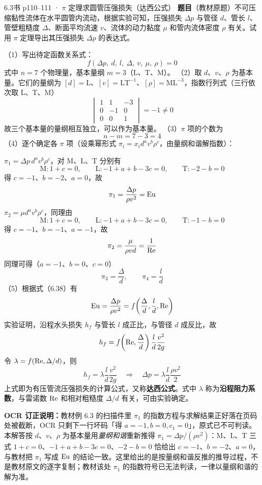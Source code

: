 \begin{liti}{6.3}{书 p110--111 · $\pi$ 定理求圆管压强损失（达西公式）}
\textbf{题目}（教材原题）不可压缩黏性流体在水平圆管内流动，根据实验可知，压强损失 $\Delta p$ 与管径 $d$、管长 $l$、管壁粗糙度 $\Delta$、断面平均流速 $v$、流体的动力黏度 $\mu$ 和管内流体密度 $\rho$ 有关。试用 $\pi$ 定理导出其压强损失 $\Delta p$ 的表达式。


\begin{jie}
（1）写出待定函数关系式：
\[ f(\Delta p,\ d,\ l,\ \Delta,\ v,\ \mu,\ \rho)=0 \]
式中 $n=7$ 个物理量，基本量纲 $m=3$（$\mathrm{L}$、$\mathrm{T}$、$\mathrm{M}$）。
（2）取 $d$、$v$、$\rho$ 为基本量。它们的量纲为 $[d]=\mathrm{L}$、$[v]=\mathrm{LT^{-1}}$、$[\rho]=\mathrm{ML^{-3}}$，指数行列式（三行依次取 $\mathrm{L}$、$\mathrm{T}$、$\mathrm{M}$）
\[ \begin{vmatrix}1 & 1 & -3\\ 0 & -1 & 0\\ 0 & 0 & 1\end{vmatrix}=-1\neq 0 \]
故三个基本量的量纲相互独立，可以作为基本量。
（3）$\pi$ 项的个数为
\[ n-m=7-3=4 \]
（4）逐个确定各 $\pi$ 项（设乘幂形式 $\pi_i=x_i d^{a}v^{b}\rho^{c}$，由量纲和谐解指数）：

$\pi_1=\Delta p\,d^{a}v^{b}\rho^{c}$，对 $\mathrm{M}$、$\mathrm{L}$、$\mathrm{T}$ 分别有
\[ \mathrm{M}:1+c=0,\qquad \mathrm{L}:-1+a+b-3c=0,\qquad \mathrm{T}:-2-b=0 \]
得 $c=-1$、$b=-2$、$a=0$，故
\[ \pi_1=\frac{\Delta p}{\rho v^{2}}=\mathrm{Eu} \]
$\pi_2=\mu d^{a}v^{b}\rho^{c}$，同理由
\[ \mathrm{M}:1+c=0,\qquad \mathrm{L}:-1+a+b-3c=0,\qquad \mathrm{T}:-1-b=0 \]
得 $c=-1$、$b=-1$、$a=-1$，故
\[ \pi_2=\frac{\mu}{\rho v d}=\frac{1}{\mathrm{Re}} \]
同理可得（$a=-1$、$b=0$、$c=0$）
\[ \pi_3=\frac{\Delta}{d},\qquad \pi_4=\frac{l}{d} \]
（5）根据式（6.38）有
\[ \mathrm{Eu}=\frac{\Delta p}{\rho v^{2}}=f\!\left(\frac{\Delta}{d},\frac{l}{d},\mathrm{Re}\right) \]
实验证明，沿程水头损失 $h_f$ 与管长 $l$ 成正比，与管径 $d$ 成反比，故
\[ h_f=f\!\left(\mathrm{Re},\frac{\Delta}{d}\right)\frac{l}{d}\frac{v^{2}}{2g} \]
令 $\lambda=f(\mathrm{Re},\Delta/d)$，则
\[ h_f=\lambda\frac{l}{d}\frac{v^{2}}{2g}\quad\Longrightarrow\quad \Delta p=\lambda\frac{l}{d}\frac{\rho v^{2}}{2} \]
上式即为有压管流压强损失的计算公式，又称\textbf{达西公式}。式中 $\lambda$ 称为\textbf{沿程阻力系数}，与雷诺数 $\mathrm{Re}$ 和相对粗糙度 $\Delta/d$ 有关，可由实验确定。
\end{jie}

\begin{tishi}
\textbf{OCR 订正说明：}教材例 6.3 的扫描件里 $\pi_1$ 的指数方程与求解结果正好落在页码处被截断，OCR 只剩下一行坏码「得 $a=-1,b=0,c_1=0$」，原式已不可判读。本解答按 $d$、$v$、$\rho$ 为基本量用\emph{量纲和谐}重新推得 $\pi_1=\Delta p/(\rho v^{2})$：$\mathrm{M}$、$\mathrm{L}$、$\mathrm{T}$ 三式 $1+c=0$、$-1+a+b-3c=0$、$-2-b=0$ 恰给出 $c=-1$、$b=-2$、$a=0$，与教材把 $\pi_1$ 写成 $\mathrm{Eu}$ 的结论一致。这里给出的是按量纲和谐反推的推导过程，不是教材原文的逐字复制；教材该处 $\pi_1$ 的指数符号已无法判读，一律以量纲和谐的解为准。
\end{tishi}
\end{liti}

